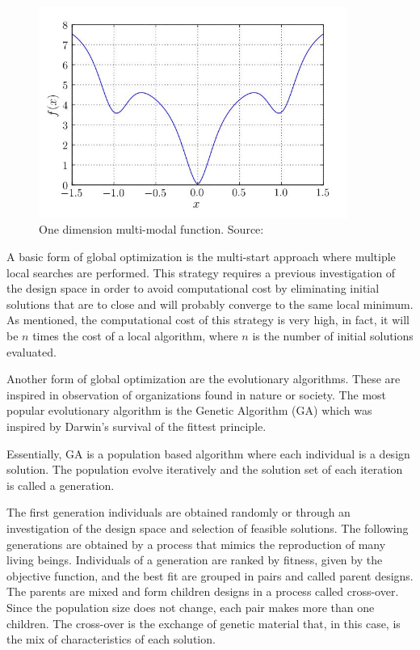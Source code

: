 \begin{figure}[H]
	\centering
	\centerline{\includegraphics[width=0.9\textwidth]{Figuras/2.TheoryBackground/2-4-2-MultimodalFunction.jpg}}
	\caption{One dimension multi-modal function. Source: }
	\label{fig:2_4_2_MultimodalFunction}
\end{figure}

A basic form of global optimization is the multi-start approach where multiple local searches are performed. This strategy requires a previous investigation of the design space in order to avoid computational cost by eliminating initial solutions that are to close and will probably converge to the same local minimum. As mentioned, the computational cost of this strategy is very high, in fact, it will be $n$ times the cost of a local algorithm, where $n$ is the number of initial solutions evaluated.

Another form of global optimization are the evolutionary algorithms. These are inspired in observation of organizations found in nature or society. The most popular evolutionary algorithm is the Genetic Algorithm (GA) which was inspired by Darwin's survival of the fittest principle.

Essentially, GA is a population based algorithm where each individual is a design solution. The population evolve iteratively and the solution set of each iteration is called a generation.

The first generation individuals are obtained randomly or through an investigation of the design space and selection of feasible solutions. The following generations are obtained by a process that mimics the reproduction of many living beings. Individuals of a generation are ranked by fitness, given by the objective function, and the best fit are grouped in pairs and called parent designs. The parents are mixed and form children designs in a process called cross-over. Since the population size does not change, each pair makes more than one children. The cross-over is the exchange of genetic material that, in this case, is the mix of characteristics of each solution. 

